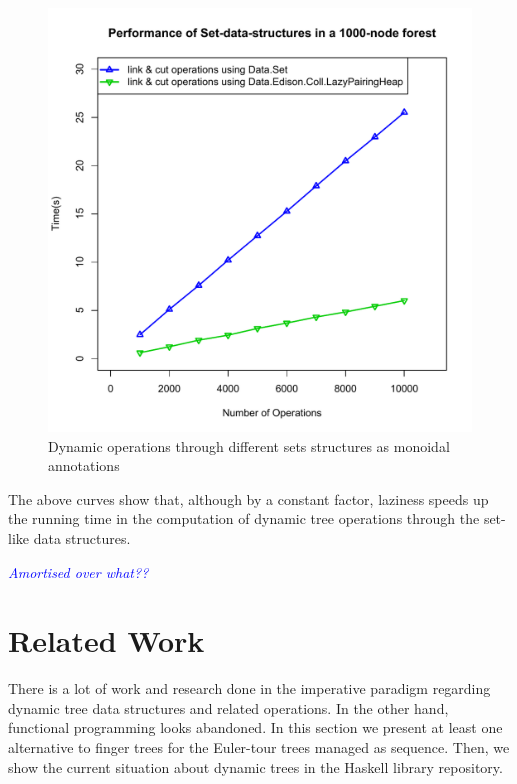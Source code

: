 \documentclass{elsarticle}
\newcommand{\tcb} [1]{\emph{\textcolor{blue}{#1}}}
\begin{document}
\begin{figure}[H]
\begin{center}
\includegraphics[scale=0.4]{./Images/plotSets} 
\end{center}
\caption{Dynamic operations through different sets structures as monoidal annotations}
\label{fig:plotSets}
\end{figure}

The above curves show that, although by a constant factor, laziness speeds up the running time in the computation of dynamic tree operations through the set-like data structures.

\tcb{Amortised over what??}



\section{Related Work} 
\label{sec:RelWrk} 

There is a lot of work and research done in the imperative paradigm regarding dynamic tree data structures and related operations. In the other hand, functional programming looks abandoned. In this section we present at least one alternative to finger trees for the Euler-tour trees managed as sequence. Then, we show the current situation about dynamic trees in the Haskell library repository.
\end{document}
